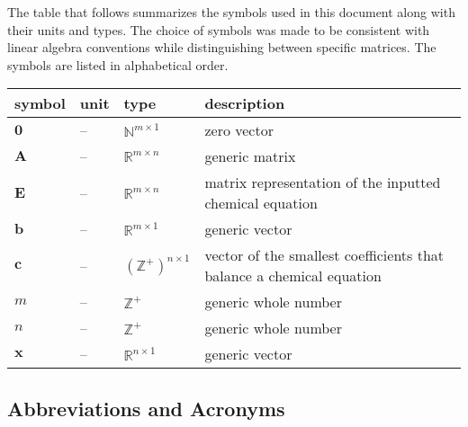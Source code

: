 \documentclass[12pt]{article}
\begin{document}
The table that follows summarizes the symbols used in this document along with
their units and types. The choice of symbols was made to be consistent with
linear algebra conventions while distinguishing between specific matrices.  The
symbols are listed in alphabetical order.

\noindent \begin{tabularx}{\textwidth}{l l l X} \toprule
  \textbf{symbol} & \textbf{unit} & \textbf{type}                 & \textbf{description}                             \\
  \midrule
  $\textbf{0}$    & --            & $\mathbb{N}^{m \times 1}$     & zero vector                                      \\
  $\textbf{A}$    & --            & $\mathbb{R}^{m \times n}$     & generic matrix                                   \\
  $\textbf{E}$    & --            & $\mathbb{R}^{m \times n}$     & matrix representation of the inputted chemical
  equation                                                                                                           \\
  $\textbf{b}$    & --            & $\mathbb{R}^{m \times 1}$     & generic vector                                   \\
  $\textbf{c}$    & --            & $(\mathbb{Z^+})^{n \times 1}$ & vector of the smallest coefficients that balance
  a chemical equation                                                                                                \\
  $m$             & --            & $\mathbb{Z}^+$                & generic whole number                             \\
  $n$             & --            & $\mathbb{Z}^+$                & generic whole number                             \\
  $\textbf{x}$    & --            & $\mathbb{R}^{n \times 1}$     & generic vector                                   \\
  \bottomrule
\end{tabularx}

\subsection{Abbreviations and Acronyms} \label{sec_abbsAcrs}
\end{document}
